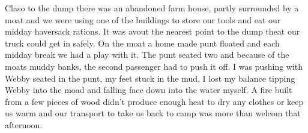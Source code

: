 Claso to the dump there was an abandoned farm house, partly surrounded
by a moat and we were using one of the buildings to store our tools
and eat our midday haversack rations. It was avout the nearest point
to the dump theat our truck could get in safely. On the moat a home
made punt floated and each midday break we had a play with it. The
punt seated two and because of the moats muddy banks, the second
passenger had to push it off. I was pushing with Webby seated in the
punt, my feet stuck in the mud, I lost my balance tipping Webby into
the moad and falling face down into the water myself. A fire built
from a few pieces of wood didn't produce enough heat to dry any
clothes or keep us warm and our transport to take us back to camp was
more than welcom that afternoon.
